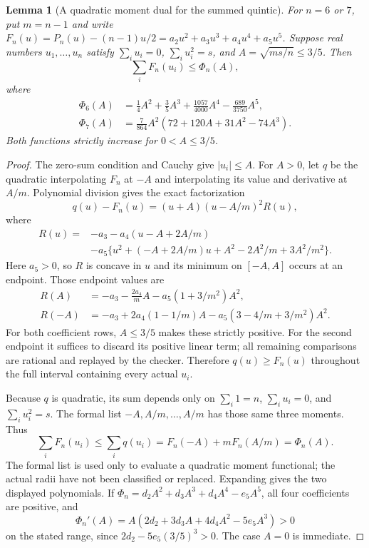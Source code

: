 \documentclass[11pt]{article}
\newtheorem{lemma}[theorem]{Lemma}
\theoremstyle{remark}
\numberwithin{equation}{section}
\begin{document}
\begin{lemma}[A quadratic moment dual for the summed quintic]
\label{lem:noorigin-oct8-quintic-dual}
For $n=6$ or $7$, put $m=n-1$ and write
$F_n(u)=P_n(u)-(n-1)u/2=a_2u^2+a_3u^3+a_4u^4+a_5u^5$.
Suppose real numbers $u_1,\ldots,u_n$ satisfy
$\sum_i u_i=0$, $\sum_i u_i^2=s$, and
$A=\sqrt{ms/n}\le3/5$. Then
\[
                 \sum_i F_n(u_i)\le\Phi_n(A),
\]
where
\begin{align*}
 \Phi_6(A)&=\frac14A^2+\frac35A^3+\frac{1057}{4000}A^4
                                      -\frac{689}{3750}A^5,\\
 \Phi_7(A)&=\frac7{864}A^2(72+120A+31A^2-74A^3).
\end{align*}
Both functions strictly increase for $0<A\le3/5$.
\end{lemma}
\begin{proof}
The zero-sum condition and Cauchy give $|u_i|\le A$.
For $A>0$, let $q$ be the quadratic interpolating $F_n$ at $-A$
and interpolating its value and derivative at $A/m$.
Polynomial division gives the exact factorization
\[
 q(u)-F_n(u)=(u+A)(u-A/m)^2 R(u),
\]
where
\begin{align*}
 R(u)={}&-a_3-a_4(u-A+2A/m)\\
        &-a_5\{u^2+(-A+2A/m)u+A^2-2A^2/m+3A^2/m^2\}.
\end{align*}
Here $a_5>0$, so $R$ is concave in $u$ and its minimum on
$[-A,A]$ occurs at an endpoint. Those endpoint values are
\begin{align*}
 R(A)&=-a_3-\frac{2a_4}mA-a_5(1+3/m^2)A^2,\\
 R(-A)&=-a_3+2a_4(1-1/m)A-a_5(3-4/m+3/m^2)A^2.
\end{align*}
For both coefficient rows, $A\le3/5$ makes these strictly positive.
For the second endpoint it suffices to discard its positive linear
term; all remaining comparisons are rational and replayed by the
checker. Therefore $q(u)\ge F_n(u)$ throughout the full interval
containing every actual $u_i$.

Because $q$ is quadratic, its sum depends only on
$\sum_i1=n$, $\sum_i u_i=0$, and $\sum_i u_i^2=s$.
The formal list $-A,A/m,\ldots,A/m$ has those same three moments.
Thus
\[
 \sum_iF_n(u_i)\le\sum_iq(u_i)
      =F_n(-A)+mF_n(A/m)=\Phi_n(A).
\]
The formal list is used only to evaluate a quadratic moment
functional; the actual radii have not been classified or replaced.
Expanding gives the two displayed polynomials. If
$\Phi_n=d_2A^2+d_3A^3+d_4A^4-e_5A^5$,
all four coefficients are positive, and
\[
 \Phi_n'(A)=A(2d_2+3d_3A+4d_4A^2-5e_5A^3)>0
\]
on the stated range, since $2d_2-5e_5(3/5)^3>0$.
The case $A=0$ is immediate.
\end{proof}
\end{document}
